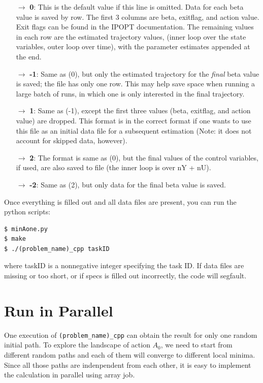 \documentclass[11pt]{article}
\begin{document}
{\begin{itemize}
\item[$\rightarrow$] {\bf 0}: This is the default value if this line is omitted. Data for each beta value is saved by row. The first 3 columns are beta, exitflag, and action value. Exit flags can be found in the IPOPT documentation. The remaining values in each row are the estimated trajectory values, (inner loop over the state variables, outer loop over time), with the parameter estimates appended at the end. 

\item[$\rightarrow$] {\bf -1}: Same as (0), but only the estimated trajectory for the {\it final} beta value is saved; the file has only one row. This may help save space when running a large batch of runs, in which one is only interested in the final trajectory.

\item[$\rightarrow$] {\bf 1}: Same as (-1), except the first three values (beta, exitflag, and action value) are dropped. This format is in the correct format if one wants to use this file as an initial data file for a subsequent estimation (Note: it does not account for skipped data, however).

\item[$\rightarrow$] {\bf 2}: The format is same as (0), but the final values of the control variables, if used, are also saved to file (the inner loop is over nY + nU).

\item[$\rightarrow$] {\bf -2}: Same as (2), but only data for the final beta value is saved.

\end{itemize}



Once everything is filled out and all data files are present, you can run the python scripts:
\begin{verbatim}
$ minAone.py
$ make
$ ./(problem_name)_cpp taskID
\end{verbatim}
where taskID is a nonnegative integer specifying the task ID. If data files are missing or too short, or if specs is filled out incorrectly, the code will segfault.

\section{Run in Parallel}
One execution of \texttt{(problem\_name)\_cpp} can obtain the result for only one random initial path.
To explore the landscape of action $A_0$, we need to start from different random paths and each of them will converge to different local minima. Since all those paths are indenpendent from each other, it is easy to implement the calculation in parallel using array job.

}
\end{document}
